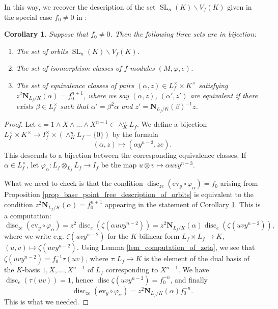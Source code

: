 \documentclass{article} %
\newtheorem{corollary}[proposition]{Corollary}
\numberwithin{equation}{section}
\DeclareMathOperator{\SL}{SL}
\DeclareMathOperator{\disc}{disc}
\begin{document}
In this way, we recover the description of the set $\SL_n(K) \backslash V_f(K)$ given in the special case $f_0 \neq 0$ in \cite[Theorem 7]{BGW15}:
\begin{corollary}\label{cor_base_point_description_of_rational_orbits}
    Suppose that $f_0 \neq 0$. Then the following three sets are in bijection:
    \begin{enumerate}
         \item The set of orbits $\SL_n(K) \backslash V_f(K)$.
        \item The set of isomorphism classes of $f$-modules $(M, 
        \varphi, e)$.
        \item The set of equivalence classes of pairs $(\alpha, z) \in L_f^\times \times K^\times$ satisfying $z^{2} \mathbf{N}_{L_f / K}(\alpha) = f_0^{n+1}$, where we say $(\alpha, z)$, $(\alpha', z')$ are equivalent if there exists $\beta \in L_f^\times$ such that $\alpha' = \beta^2 \alpha$ and $z' = \mathbf{N}_{L_f / K}(\beta)^{-1} z$. 
    \end{enumerate}
\end{corollary}
\begin{proof}
    Let $e = 1 \wedge X \wedge \dots \wedge X^{n-1} \in \wedge^n_K L_f$. We define a bijection $L_f^\times \times K^\times \to I_f^\times \times (\wedge^n_K L_f - \{ 0 \})$ by the formula 
    \[ (\alpha, z) \mapsto (\alpha y^{n-3}, z e). \]
    This descends to a bijection between the corresponding equivalence classes. If $\alpha \in L_f^\times$, let $\varphi_\alpha : L_f \otimes_{L_f} L_f \to I_f$ be the map $u \otimes v \mapsto \alpha u v y^{n-3}$. 
    
    What we need to check is that the condition $\disc_{ze}( \mathrm{ev}_y \circ \varphi_\alpha) = f_0$ arising from Proposition \ref{prop_base_point_free_description_of_orbits} is equivalent to the condition $z^{2} \mathbf{N}_{L_f / K}(\alpha) = f_0^{n+1}$ appearing in the statement of Corollary \ref{cor_base_point_description_of_rational_orbits}. This is a computation: 
    \[ \disc_{ze}( \mathrm{ev}_y \circ \varphi_\alpha) = z^2 \disc_e ( \zeta(\alpha u v y^{n-2}) ) = z^2 \mathbf{N}_{L_f / K}(\alpha) \disc_e (\zeta (u v y^{n-2} ) ), \]
    where we write e.g. $\zeta (u v y^{n-2})$ for the $K$-bilinear form $L_f \times L_f \to K$, $(u, v) \mapsto \zeta (u v y^{n-2} )$. Using Lemma \ref{lem_computation_of_zeta}, we see that $\zeta (u v y^{n-2}) = f_0^{-1} \tau(uv)$, where $\tau : L_f \to K$ is the element of the dual basis of the $K$-basis $1, X, \dots, X^{n-1}$ of $L_f$ corresponding to $X^{n-1}$. We have $\disc_e( \tau(uv)) = 1$, hence $\disc \zeta (u v y^{n-2}) = f_0^{-n}$, and finally
    \[ \disc_{ze}( \mathrm{ev}_y \circ \varphi_\alpha) = z^2 \mathbf{N}_{L_f / K}(\alpha) f_0^{-n}. \]
    This is what we needed. 
\end{proof}
\end{document}
